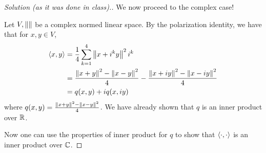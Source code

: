 \begin{proof}[Solution (as it was done in class).]
We now proceed to the complex case!

Let $V, \left\lVert  \right\rVert$ be a complex normed linear space. By the polarization identity, we have that for $x, y \in V$,
\begin{align*}
    \left\langle x,y \right\rangle &= \frac{1}{4} \sum_{k=1}^{4} \left\lVert x+i^{k}y \right\rVert^{2} i^{k} \\
    &= \frac{\left\lVert x+y \right\rVert^{2} - \left\lVert x-y \right\rVert^{2}}{4} - \frac{\left\lVert x+iy \right\rVert^{2} - \left\lVert x-iy \right\rVert^{2}}{4} \\
    &= q(x,y)+i q(x,iy)
\end{align*}
where $q(x,y)=  \frac{\left\lVert x+y \right\rVert^{2} - \left\lVert x-y \right\rVert^{2}}{4}$. We have already shown that $q$ is an inner product over $\mathbb R$. 

Now one can use the properties of inner product for $q$ to show that $\left\langle \cdot , \cdot \right\rangle$ is an inner product over $\mathbb C$.

\end{proof}
